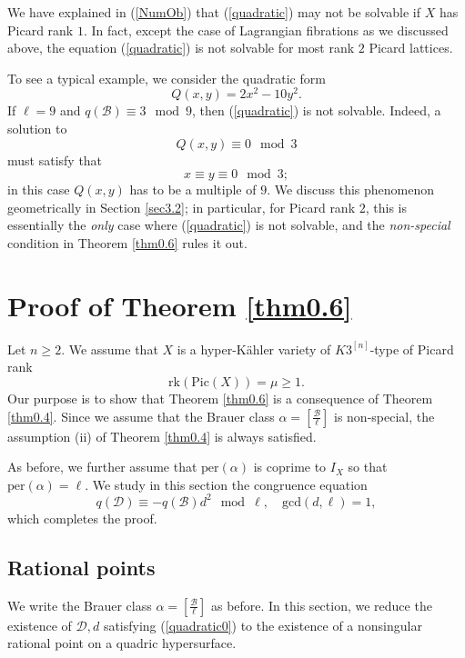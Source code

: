 \documentclass[11pt]{amsart}
\theoremstyle{plain}
\theoremstyle{definition}
\theoremstyle{remark}
\newcommand{\CB}{{\mathcal B}}
\newcommand{\CD}{{\mathcal D}}
\begin{document}
We have explained in (\ref{NumOb}) that (\ref{quadratic}) may not be solvable if $X$ has Picard rank $1$. In fact, except the case of Lagrangian fibrations as we discussed above, the equation (\ref{quadratic}) is not solvable for most rank $2$ Picard lattices.

To see a typical example, we consider the quadratic form
\[
Q(x,y) = 2x^2 -10y^2.
\]
If $\ell=9$ and $q(\CB) \equiv 3 \mod 9$, then (\ref{quadratic}) is not solvable. Indeed, a solution to 
\[
Q(x,y) \equiv 0 \mod 3
\]
must satisfy that 
\[
x\equiv y \equiv 0 \mod 3; 
\]
in this case $Q(x,y)$ has to be a multiple of $9$. We discuss this phenomenon geometrically in Section \ref{sec3.2}; in particular, for Picard rank $2$, this is essentially the \emph{only} case where (\ref{quadratic}) is not solvable, and the \emph{non-special} condition in Theorem \ref{thm0.6} rules it out.




\section{Proof of Theorem \ref{thm0.6}}

Let $n \geq 2$. We assume that $X$ is a hyper-K\"ahler variety of $K3^{[n]}$-type of Picard rank 
\[
\mathrm{rk}(\mathrm{Pic}(X)) = \mu \geq 1.
\]
Our purpose is to show that Theorem \ref{thm0.6} is a consequence of Theorem \ref{thm0.4}. Since we assume that the Brauer class $\alpha = [\frac{\CB}{\ell}]$ is non-special, the assumption (ii) of Theorem \ref{thm0.4} is always satisfied. 

As before, we further assume that $\mathrm{per}(\alpha)$ is coprime to $I_X$ so that $\mathrm{per}(\alpha) = \ell$. We study in this section the congruence equation
\begin{equation}\label{quadratic0}
q(\CD) \equiv -q(\CB)d^2 \mod \ell, \quad \mathrm{gcd}(d,\ell) =1,
\end{equation}
which completes the proof.




\subsection{Rational points}
We write the Brauer class $\alpha = \left[ \frac{\CB}{\ell}\right]$ as before. In this section, we reduce the existence of $\CD,d$ satisfying (\ref{quadratic0}) to the existence of a nonsingular rational point on a quadric hypersurface.
\end{document}
